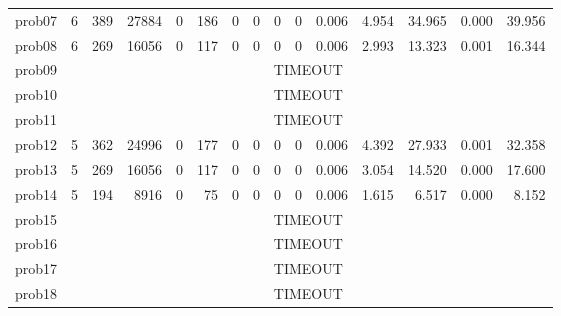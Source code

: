 \begin{table}[H]
{\begin{tabular}{lrrr rr rr rr rrrrr}
            prob07           & 6                                     & 389             & 27884       & 0           & 186          & 0 & 0 & 0 & 0 & 0.006 & 4.954 & 34.965 & 0.000 & 39.956 \\
            prob08           & 6                                     & 269             & 16056       & 0           & 117          & 0 & 0 & 0 & 0 & 0.006 & 2.993 & 13.323 & 0.001 & 16.344 \\
            prob09           & \multicolumn{14}{c}{TIMEOUT}                                                                                                                                 \\
            prob10           & \multicolumn{14}{c}{TIMEOUT}                                                                                                                                 \\
            prob11           & \multicolumn{14}{c}{TIMEOUT}                                                                                                                                 \\
            prob12           & 5                                     & 362             & 24996       & 0           & 177          & 0 & 0 & 0 & 0 & 0.006 & 4.392 & 27.933 & 0.001 & 32.358 \\
            prob13           & 5                                     & 269             & 16056       & 0           & 117          & 0 & 0 & 0 & 0 & 0.006 & 3.054 & 14.520 & 0.000 & 17.600 \\
            prob14           & 5                                     & 194             & 8916        & 0           & 75           & 0 & 0 & 0 & 0 & 0.006 & 1.615 & 6.517  & 0.000 & 8.152  \\
            prob15           & \multicolumn{14}{c}{TIMEOUT}                                                                                                                                 \\
            prob16           & \multicolumn{14}{c}{TIMEOUT}                                                                                                                                 \\
            prob17           & \multicolumn{14}{c}{TIMEOUT}                                                                                                                                 \\
            prob18           & \multicolumn{14}{c}{TIMEOUT}                                                                                                                                 \\

\end{tabular}}
\end{table}
